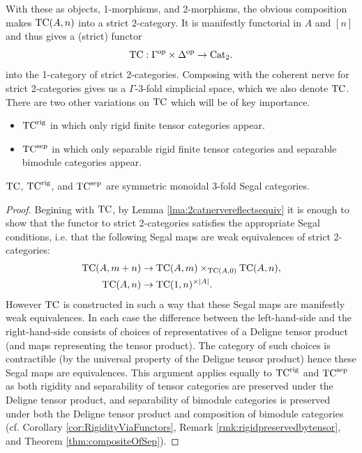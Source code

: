 \documentclass{amsart}
\begin{document}
With these as objects, 1-morphisms, and 2-morphisms, the obvious composition makes $\mathrm{TC}(A,n)$ into a strict $2$-category. It is manifestly functorial in $A$ and $[n]$ and thus gives a (strict) functor 
\begin{equation*}
	\mathrm{TC}: \Gamma^\textrm{op} \times \Delta^\textrm{op} \to \mathrm{Cat}_2.
\end{equation*}
into the 1-category of strict 2-categories. Composing with the coherent nerve for strict 2-categories gives us a $\Gamma$-3-fold simplicial space, which we also denote $\mathrm{TC}$. There are two other variations on $\mathrm{TC}$ which will be of key importance. 
\begin{itemize}
	\item ${\mathrm{TC}^{\text{rig}}}$ in which only rigid finite tensor categories appear. 
	\item ${\mathrm{TC}^{\text{sep}}}$ in which only separable rigid finite tensor categories and separable bimodule categories appear. 
\end{itemize}



\begin{theorem}
	 $\mathrm{TC}$, ${\mathrm{TC}^{\text{rig}}}$, and ${\mathrm{TC}^{\text{sep}}}$ are symmetric monoidal 3-fold Segal categories.  
\end{theorem}

\begin{proof}
	Begining with $\mathrm{TC}$,
	by Lemma \ref{lma:2catnervereflectsequiv} it is enough to show that the functor to strict 2-categories satisfies the appropriate Segal conditions, i.e. that the following Segal maps are weak equivalences of strict 2-categories:
	\begin{align*}
		\mathrm{TC}(A, m + n) & \to \mathrm{TC}(A, m) \times_{\mathrm{TC}(A, 0)} \mathrm{TC}(A, n), \\
		\mathrm{TC}(A, n) & \to \mathrm{TC}(1, n)^{\times |A|}. 
	\end{align*}
However $\mathrm{TC}$ is constructed in such a way that these Segal maps are manifestly weak equivalences. In each case the difference between the left-hand-side and the right-hand-side consists of choices of representatives of a Deligne tensor product (and maps representing the tensor product). The category of such choices is contractible (by the universal property of the Deligne tensor product) hence these Segal maps are equivalences. This argument applies equally to ${\mathrm{TC}^{\text{rig}}}$ and ${\mathrm{TC}^{\text{sep}}}$ as both rigidity and separability of tensor categories are preserved under the Deligne tensor product, and separability of bimodule categories is preserved  under both the Deligne tensor product and composition of bimodule categories (cf. Corollary \ref{cor:RigidityViaFunctors}, Remark \ref{rmk:rigidpreservedbytensor}, and Theorem \ref{thm:compositeOfSep}).  
\end{proof}
 
\end{document}
